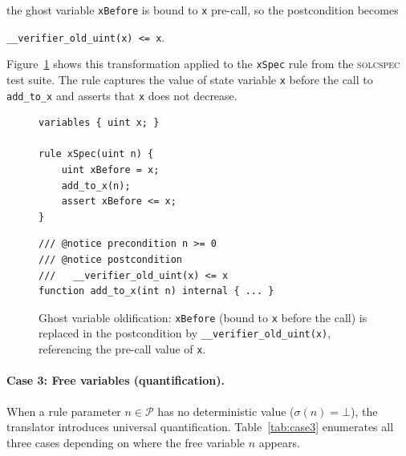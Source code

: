 \noindent the ghost variable \texttt{xBefore} is bound to \texttt{x} pre-call, so the postcondition becomes 

\noindent \texttt{\_\_verifier\_old\_uint(x) <= x}.

Figure~\ref{fig:ghost-example} shows this transformation applied to the \texttt{xSpec} rule from the \textsc{solcspec} test suite. The rule captures the value of state variable \texttt{x} before the call to \texttt{add\_to\_x} and asserts that \texttt{x} does not decrease.

\begin{figure}[h]
\centering
\begin{minipage}{0.47\textwidth}
\begin{lstlisting}[style=solstyle]
variables { uint x; }

rule xSpec(uint n) {
    uint xBefore = x;
    add_to_x(n);
    assert xBefore <= x;
}
\end{lstlisting}
\end{minipage}
\hfill
\begin{minipage}{0.47\textwidth}
\begin{lstlisting}[style=solstyle]
/// @notice precondition n >= 0
/// @notice postcondition
///   __verifier_old_uint(x) <= x
function add_to_x(int n) internal { ... }
\end{lstlisting}
\end{minipage}
\caption{Ghost variable oldification: \texttt{xBefore} (bound to \texttt{x} before the call) is replaced in the postcondition by \texttt{\_\_verifier\_old\_uint(x)}, referencing the pre-call value of \texttt{x}.}
\label{fig:ghost-example}
\end{figure}

\paragraph{Case 3: Free variables (quantification).}
When a rule parameter $n \in \mathcal{P}$ has no deterministic value ($\sigma(n) = \bot$), the translator introduces universal quantification. Table~\ref{tab:case3} enumerates all three cases depending on where the free variable $n$ appears.

